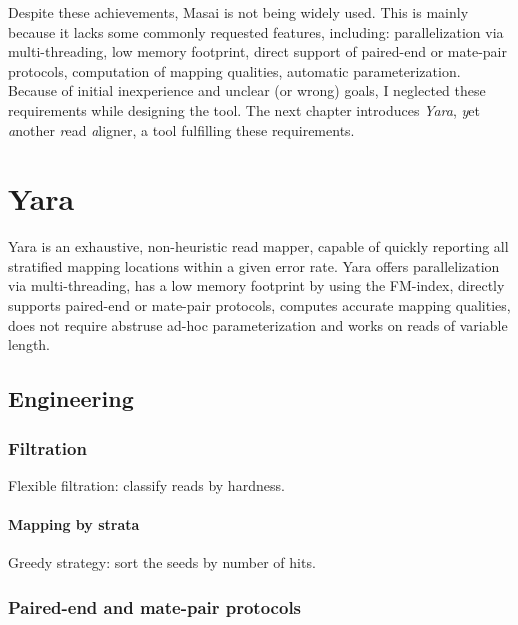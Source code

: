 Despite these achievements, Masai is not being widely used.
This is mainly because it lacks some commonly requested features, including:
parallelization via multi-threading, low memory footprint, direct support of paired-end or mate-pair protocols, computation of mapping qualities, automatic parameterization.
Because of initial inexperience and unclear (or wrong) goals, I neglected these requirements while designing the tool.
The next chapter introduces \emph{Yara}, \emph{y}et \emph{a}nother \emph{r}ead \emph{a}ligner, a tool fulfilling these requirements.



\chapter{Yara}


Yara is an exhaustive, non-heuristic read mapper, capable of quickly reporting all stratified mapping locations within a given error rate.
Yara offers parallelization via multi-threading, has a low memory footprint by using the FM-index, directly supports paired-end or mate-pair protocols, computes accurate mapping qualities, does not require abstruse ad-hoc parameterization and works on reads of variable length.



\section{Engineering}

\subsection{Filtration}

Flexible filtration: classify reads by hardness.

\subsubsection{Mapping by strata}

Greedy strategy: sort the seeds by number of hits.

\subsection{Paired-end and mate-pair protocols}

